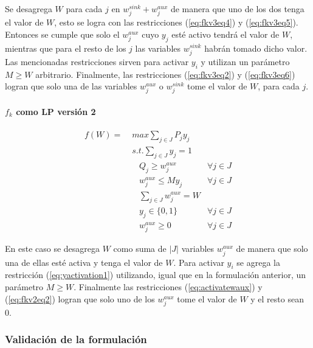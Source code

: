 \documentclass{article}
\begin{document}
  Se desagrega $W$ para cada $j$ en $w^{sink}_j + w^{aux}_j$ de manera que uno de los dos tenga el valor de $W$, esto se logra con las restricciones (\ref{eq:fkv3eq4}) y (\ref{eq:fkv3eq5}). Entonces se cumple que solo el $w^{aux}_j$ cuyo $y_j$ esté activo tendrá el valor de $W$, mientras que para el resto de los $j$ las variables $w^{sink}_j$ habrán tomado dicho valor. Las mencionadas restricciones sirven para activar $y_i$ y utilizan un parámetro $M \geq W$ arbitrario. Finalmente, las restricciones (\ref{eq:fkv3eq2}) y (\ref{eq:fkv3eq6}) logran que solo una de las variables $w^{aux}_j$ o $w^{sink}_j$ tome el valor de $W$, para cada $j$.

  \paragraph*{$f_k$ como LP versión 2}

  \begin{align}
    f(W) =\; & max \sum_{j \in J} P_j y_j             & \label{eq:fkv2eq1}\\
             & s.t. \sum_{j \in J} y_j = 1            & \label{eq:fkv2eq2}\\
             & \;\;\; Q_j \geq w^{aux}_j              & \forall j \in J \label{eq:implfkoriginalineq} \\
             & \;\;\; w^{aux}_j \leq M y_j            & \forall j \in J \label{eq:yactivation1} \\
             & \;\;\; \sum_{j \in J} w^{aux}_j = W    & \label{eq:activatewaux} \\
             & \;\;\; y_j \in \{0,1\}                 & \label{eq:fkv2domainy} \forall j \in J\\
             & \;\;\; w^{aux}_j \geq 0                & \label{eq:fkv2eq6} \forall j \in J
  \end{align}

  En este caso se desagrega $W$ como suma de $|J|$ variables $w^{aux}_j$ de manera que solo una de ellas esté activa y tenga el valor de $W$. Para activar $y_i$ se agrega la restricción (\ref{eq:yactivation1}) utilizando, igual que en la formulación anterior, un parámetro $M \geq W$. Finalmente las restricciones (\ref{eq:activatewaux}) y (\ref{eq:fkv2eq2}) logran que solo uno de los $w^{aux}_j$ tome el valor de $W$ y el resto sean 0.

  \subsubsection{Validación de la formulación}
\end{document}
